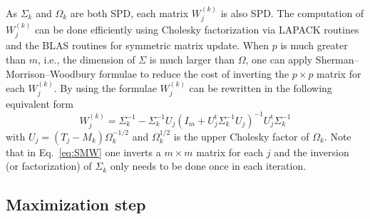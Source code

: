 \documentclass[english,listof=totoc]{scrartcl}
\begin{document}
As $\Sigma_k$ and $\Omega_k$ are both SPD, each matrix $W_j^{(k)}$ is also SPD. The computation of $W_j^{(k)}$ can be done efficiently using Cholesky factorization via LAPACK routines and the BLAS routines for symmetric matrix update. When $p$ is much greater than $m$, i.e., the dimension of $\Sigma$ is much larger than $\Omega$, one can apply Sherman--Morrison--Woodbury formulae \citep{doi:10.1137/1023004} to reduce the cost of inverting the $p\times p$ matrix for each $W_j^{(k)}$. By using the formulae $W_j^{(k)}$ can be rewritten in the following equivalent form
\begin{equation}
W_j^{(k)}=\Sigma_k^{-1}-\Sigma_k^{-1}U_j\left(I_m+U_j^{\textrm{t}}\Sigma_k^{-1}U_j\right)^{-1}U_j^{\textrm{t}}\Sigma_k^{-1}\label{eq:SMW}
\end{equation}
with $U_j=(T_j-M_k)\Omega_k^{-1/2}$ and $\Omega_k^{1/2}$ is the upper Cholesky factor of $\Omega_k$. Note that in Eq.~\eqref{eq:SMW} one inverts a $m\times m$ matrix for each $j$ and the inversion (or factorization) of $\Sigma_k$ only needs to be done once in each iteration.

\subsection{Maximization step}
\end{document}
